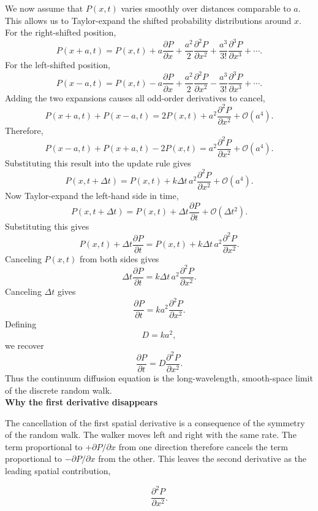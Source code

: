 We now assume that $P(x,t)$ varies smoothly over distances comparable to $a$.
This allows us to Taylor-expand the shifted probability distributions around $x$.
For the right-shifted position,
\[
    P(x+a,t) = P(x,t) + a\frac{\partial P}{\partial x} + \frac{a^2}{2}\frac{\partial^2P}{\partial x^2} + \frac{a^3}{3!}\frac{\partial^3P}{\partial x^3} + \cdots.
\]
For the left-shifted position,
\[
    P(x-a,t) = P(x,t) - a\frac{\partial P}{\partial x} + \frac{a^2}{2}\frac{\partial^2P}{\partial x^2} - \frac{a^3}{3!}\frac{\partial^3P}{\partial x^3} + \cdots.
\]
% 
Adding the two expansions causes all odd-order derivatives to cancel,
% 
\[
    P(x+a,t)+P(x-a,t) = 2P(x,t) + a^2\frac{\partial^2P}{\partial x^2} + \mathcal{O}(a^4).
\]
% 
Therefore,
% 
\[
    P(x-a,t)+P(x+a,t)-2P(x,t) = a^2\frac{\partial^2P}{\partial x^2} + \mathcal{O}(a^4).
\]
% 
Substituting this result into the update rule gives
% 
\[
    P(x,t+\Delta t) = P(x,t) + k\Delta t\,a^2\frac{\partial^2P}{\partial x^2} + \mathcal{O}(a^4).
\]
% 
Now Taylor-expand the left-hand side in time,
% 
\[
    P(x,t+\Delta t) = P(x,t) + \Delta t\frac{\partial P}{\partial t} + \mathcal{O}(\Delta t^2).
\]
% 
Substituting this gives
% 
\[
    P(x,t) + \Delta t\frac{\partial P}{\partial t} = P(x,t) + k\Delta t\,a^2\frac{\partial^2P}{\partial x^2}.
\]
% 
Canceling $P(x,t)$ from both sides gives
% 
\[
    \Delta t\frac{\partial P}{\partial t} = k\Delta t\,a^2\frac{\partial^2P}{\partial x^2}.
\]
% 
Canceling $\Delta t$ gives
% 
\[
    \frac{\partial P}{\partial t} = ka^2\frac{\partial^2P}{\partial x^2}.
\]
% 
Defining
% 
\[
    \boxed{D=ka^2,}
\]
% 
we recover
% 
\[
    \boxed{\frac{\partial P}{\partial t} = D\frac{\partial^2P}{\partial x^2}.}
\]
% 
Thus the continuum diffusion equation is the long-wavelength, smooth-space limit of the discrete random walk.
% 
% 
\medskip
\\
\textbf{Why the first derivative disappears}

The cancellation of the first spatial derivative is a consequence of the symmetry of the random walk.
The walker moves left and right with the same rate.
The term proportional to $+\partial P/\partial x$ from one direction therefore cancels the term proportional to $-\partial P/\partial x$ from the other.
This leaves the second derivative as the leading spatial contribution,

\[
    \frac{\partial^2P}{\partial x^2}.
\]

